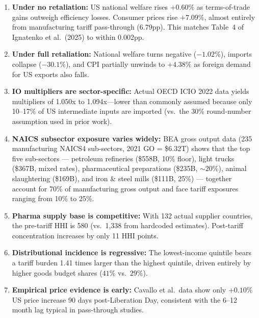 \documentclass[12pt]{article}
\begin{document}
\begin{enumerate}
    \item \textbf{Under no retaliation:} US national welfare rises $+0.60\%$
    as terms-of-trade gains outweigh efficiency losses. Consumer prices rise
    $+7.09\%$, almost entirely from manufacturing tariff pass-through (6.79pp).
    This matches Table~4 of Ignatenko et al.\ (2025) to within 0.002pp.

    \item \textbf{Under full retaliation:} National welfare turns negative
    ($-1.02\%$), imports collapse ($-30.1\%$), and CPI partially unwinds to
    $+4.38\%$ as foreign demand for US exports also falls.

    \item \textbf{IO multipliers are sector-specific:} Actual OECD ICIO 2022
    data yields multipliers of 1.050x to 1.094x---lower than commonly assumed
    because only 10--17\% of US intermediate inputs are imported (vs.\ the 30\%
    round-number assumption used in prior work).

    \item \textbf{NAICS subsector exposure varies widely:} BEA gross output data
    (235 manufacturing NAICS4 sub-sectors, 2021 GO = \$6.32T) shows that the
    top five sub-sectors --- petroleum refineries (\$558B, 10\% floor), light
    trucks (\$367B, mixed rates), pharmaceutical preparations (\$235B,
    $\sim$20\%), animal slaughtering (\$169B), and iron \& steel mills
    (\$111B, 25\%) --- together account for 70\% of manufacturing gross output
    and face tariff exposures ranging from 10\% to 25\%.

    \item \textbf{Pharma supply base is competitive:} With 132 actual supplier
    countries, the pre-tariff HHI is 580 (vs.\ 1,338 from hardcoded estimates).
    Post-tariff concentration increases by only 11 HHI points.

    \item \textbf{Distributional incidence is regressive:} The lowest-income
    quintile bears a tariff burden 1.41 times larger than the highest quintile,
    driven entirely by higher goods budget shares ($41\%$ vs.\ $29\%$).

    \item \textbf{Empirical price evidence is early:} Cavallo et al.\ data
    show only $+0.10\%$ US price increase 90 days post-Liberation Day,
    consistent with the 6--12 month lag typical in pass-through studies.
\end{enumerate}
\end{document}
